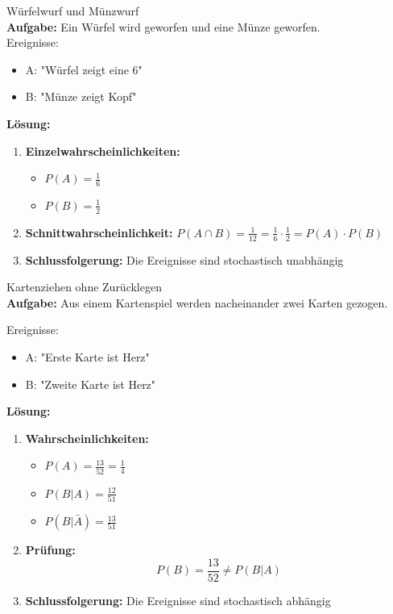 \begin{example2}{Würfelwurf und Münzwurf}\\
\textbf{Aufgabe:} Ein Würfel wird geworfen und eine Münze geworfen.\\
Ereignisse:
\begin{itemize}
\item A: "Würfel zeigt eine 6"
\item B: "Münze zeigt Kopf"
\end{itemize}

\textbf{Lösung:}
\begin{enumerate}
\item \textbf{Einzelwahrscheinlichkeiten:}
   \begin{itemize}
   \item $P(A) = \frac{1}{6}$
   \item $P(B) = \frac{1}{2}$
   \end{itemize}

\item \textbf{Schnittwahrscheinlichkeit:}
   $P(A \cap B) = \frac{1}{12} = \frac{1}{6} \cdot \frac{1}{2} = P(A) \cdot P(B)$

\item \textbf{Schlussfolgerung:} Die Ereignisse sind stochastisch unabhängig
\end{enumerate}
\end{example2}

\begin{example2}{Kartenziehen ohne Zurücklegen}\\
\textbf{Aufgabe:} Aus einem Kartenspiel werden nacheinander zwei Karten gezogen.

Ereignisse:
\begin{itemize}
\item A: "Erste Karte ist Herz"
\item B: "Zweite Karte ist Herz"
\end{itemize}

\textbf{Lösung:}
\begin{enumerate}
\item \textbf{Wahrscheinlichkeiten:}
   \begin{itemize}
   \item $P(A) = \frac{13}{52} = \frac{1}{4}$
   \item $P(B|A) = \frac{12}{51}$
   \item $P(B|\bar{A}) = \frac{13}{51}$
   \end{itemize}

\item \textbf{Prüfung:}
   $$P(B) = \frac{13}{52} \neq P(B|A)$$

\item \textbf{Schlussfolgerung:} Die Ereignisse sind stochastisch abhängig
\end{enumerate}
\end{example2}

